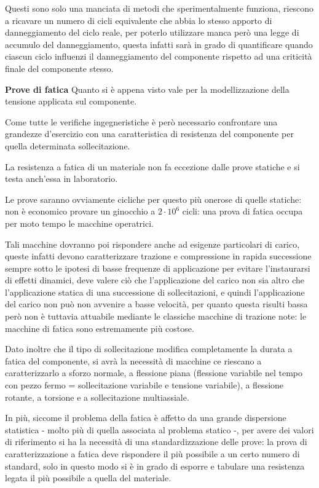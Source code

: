 \documentclass{article}
\begin{document}
\begin{adjustwidth}{2in}{}
		  Questi sono solo una manciata di metodi che sperimentalmente funziona, riescono a ricavare un numero di cicli equivalente che abbia lo stesso apporto di danneggiamento del ciclo reale, per poterlo utilizzare manca però una legge di accumulo del danneggiamento, questa infatti sarà in grado di quantificare quando ciascun ciclo influenzi il danneggiamento del componente rispetto ad una criticità finale del componente stesso. \newline
		  
		  \textbf{\Large Prove di fatica} \newline 
		  Quanto si è appena visto vale per la modellizzazione della tensione applicata sul componente. 
		  
		  Come tutte le verifiche ingegneristiche è però necessario confrontare una grandezze d'esercizio con una caratteristica di resistenza del componente per quella determinata sollecitazione.
		  
		  La resistenza a fatica di un materiale non fa eccezione dalle prove statiche e si testa anch'essa in laboratorio.
		  
		  Le prove saranno ovviamente cicliche per questo più onerose di quelle statiche: non è economico provare un ginocchio a $2\cdot10^6$ cicli: una prova di fatica occupa per moto tempo le macchine operatrici.
		  
		  Tali macchine dovranno poi rispondere anche ad esigenze particolari di carico, queste infatti devono caratterizzare trazione e compressione in rapida successione sempre sotto le ipotesi di basse frequenze di applicazione per evitare l'instaurarsi di effetti dinamici, deve valere ciò che l'applicazione del carico non sia altro che l'applicazione statica di una successione di sollecitazioni, e quindi l'applicazione del carico non può non avvenire a basse velocità, per quanto questa risulti bassa però non è tuttavia attuabile mediante le classiche macchine di trazione note: le macchine di fatica sono estremamente più costose. 
		  
		  Dato inoltre che il tipo di sollecitazione modifica completamente la durata a fatica del componente, si avrà la necessità di macchine ce riescano a caratterizzarlo a sforzo normale, a flessione piana (flessione variabile nel tempo con pezzo fermo = sollecitazione variabile e tensione variabile), a flessione rotante, a torsione e a sollecitazione multiassiale. \newline
		  
		  In più, siccome il problema della fatica è affetto da una grande dispersione statistica - molto più di quella associata al problema statico -, per avere dei valori di riferimento si ha la necessità di una standardizzazione delle prove: la prova di caratterizzazione a fatica deve rispondere il più possibile a un certo numero di standard, solo in questo modo si è in grado di esporre e tabulare una resistenza legata il più possibile a quella del materiale.\newline
		  

\end{adjustwidth}
\end{document}
